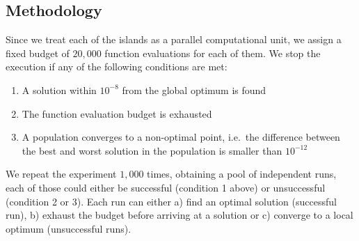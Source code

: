 \documentclass{sig-alternate}
\begin{document}

    \subsection{Methodology}

    Since we treat each of the islands as a parallel computational unit, we assign a fixed budget of $20,000$ function evaluations for each of them.
    We stop the execution if any of the following conditions are met:
    \begin{enumerate}
        \item A solution within $10^{-8}$ from the global optimum is found
        \item The function evaluation budget is exhausted
        \item A population converges to a non-optimal point, i.e.\ the difference between the best and worst solution in the population is smaller than $10^{-12}$
    \end{enumerate}

    We repeat the experiment $1,000$ times, obtaining a pool of independent runs, each of those could either be successful (condition 1 above) or unsuccessful (condition 2 or 3).
    Each run can either a) find an optimal solution (successful run), b) exhaust the budget before arriving at a solution or c) converge to a local optimum (unsuccessful runs).
\end{document}
